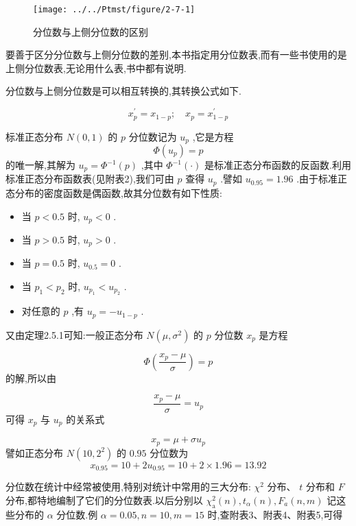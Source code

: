 \begin{figure}
	\centering
	\texttt{[image: ../../Ptmst/figure/2-7-1]}
	\caption{分位数与上侧分位数的区别}
	\label{fig:2-7-1}
\end{figure}

要善于区分分位数与上侧分位数的差别,本书指定用分位数表,而有一些书使用的是上侧分位数表,无论用什么表,书中都有说明.

分位数与上侧分位数是可以相互转换的,其转换公式如下.

\begin{equation}
x_{p}^{\prime}=x_{1-p} ; \quad x_{p}=x_{1-p}^{\prime} \label{eq:2.7.6}
\end{equation}

\begin{example}
	标准正态分布 $ N(0,1) $ 的 $ p $ 分位数记为 $ u_{p} $ ,它是方程
	\[
	\Phi\left(u_{p}\right)=p
	\]
	的唯一解,其解为 $ u_{p}=\Phi^{-1}(p) $ ,其中 $ \Phi^{-1}(\cdot) $ 是标准正态分布函数的反函数.利用标准正态分布函数表(见附表2),我们可由 $ p $ 查得 $ u_{p} $ .譬如 $ u_{0.95}=1.96 $ .由于标准正态分布的密度函数是偶函数,故其分位数有如下性质:
	
	\begin{itemize}
		\item 当 $ p<0.5 $ 时, $ u_{p}<0 $ .
		\item 当 $ p>0.5 $ 时, $ u_{p}>0 $ .
		\item 当 $ p=0.5 $ 时, $ u_{0.5}=0 $ .
		\item 当 $ p_{1}<p_{2} $ 时, $ u_{p_{1}}<u_{p_{2}} $ .
		\item 对任意的 $ p $ ,有 $ u_{p}=-u_{1-p} $ .
	\end{itemize}
	
	又由定理2.5.1可知:一般正态分布 $ N\left(\mu, \sigma^{2}\right) $ 的 $ p $ 分位数 $ x_{p} $ 是方程
	
	\[
	\Phi\left(\frac{x_{p}-\mu}{\sigma}\right)=p
	\]
	的解,所以由
	
	\[
	\frac{x_{p}-\mu}{\sigma}=u_{p}
	\]
	可得 $ x_{p} $ 与 $ u_{p} $ 的关系式
	
	\begin{equation}
	x_{p}=\mu+\sigma u_{p} \label{eq:2.7.7}
	\end{equation}
	譬如正态分布 $ N\left(10,2^{2}\right) $ 的 $ 0.95 $ 分位数为
	\[
	x_{0.95}=10+2 u_{0.95}=10+2 \times 1.96=13.92
	\]
\end{example}

分位数在统计中经常被使用,特别对统计中常用的三大分布: $ \chi^{2} $ 分布、 $ t $ 分布和 $ F $ 分布,都特地编制了它们的分位数表.以后分别以 $ \chi_{\mathrm{a}}^{2}(n), t_{\alpha}(n) , F_{a}(n, m) $ 记这些分布的 $ \alpha $ 分位数.例 $ \alpha=0.05, n=10, m=15 $ 时,查附表3、附表4、附表5,可得

